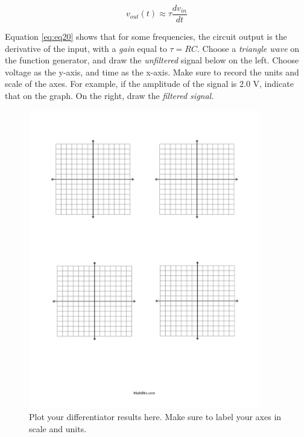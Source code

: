 \documentclass[12pt]{article}
\begin{document}
\begin{equation}
v_{out}(t) \approx \tau \frac{dv_{in}}{dt}
\label{eq:eq20}
\end{equation}

Equation \ref{eq:eq20} shows that for some frequencies, the circuit output is the derivative of the input, with a \textit{gain} equal to $\tau = RC$.  Choose a \textit{triangle wave} on the function generator, and draw the \textit{unfiltered} signal below on the left. Choose voltage as the y-axis, and time as the x-axis.  Make sure to record the units and scale of the axes.  For example, if the amplitude of the signal is 2.0 V, indicate that on the graph. On the right, draw the \textit{filtered signal.}

\begin{figure}[ht]
\centering
\includegraphics[width=0.9\textwidth,trim=0cm 18cm 0cm 2cm,clip=true]{axes.pdf}
\caption{\label{fig:axes} Plot your differentiator results here. Make sure to label your axes in scale and units.}
\end{figure}

\vspace{5cm}
\end{document}
